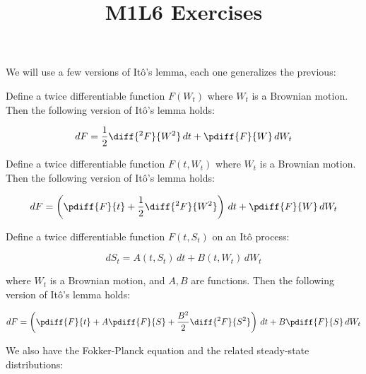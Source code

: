 \documentclass{article}
\begin{document}
	\title{M1L6 Exercises}
	\maketitle
	
	We will use a few versions of It\^o's lemma, each one generalizes the previous:
	
	\begin{lemma}\label{ito1}
		Define a twice differentiable function $F(W_t)$ where $W_t$ is a Brownian motion. Then the following version of It\^o's lemma holds:
		
		\begin{equation*}
			dF = \frac{1}{2} \diff{^2F}{W^2} \, dt + \pdiff{F}{W} \, dW_t
		\end{equation*}
	\end{lemma}
	
	\begin{lemma}\label{ito2}
		Define a twice differentiable function $F(t,W_t)$ where $W_t$ is a Brownian motion. Then the following version of It\^o's lemma holds:
		
		\begin{equation*}
			dF = \left(\pdiff{F}{t} + \frac{1}{2} \diff{^2F}{W^2}\right) \, dt + \pdiff{F}{W} \, dW_t
		\end{equation*}
	\end{lemma}
	
	\begin{lemma}\label{ito3}
		Define a twice differentiable function $F(t,S_t)$ on an It\^o process:
		
		\begin{equation*}
			dS_t = A(t,S_t) \, dt + B(t,W_t) \, dW_t
		\end{equation*}
		
		where $W_t$ is a Brownian motion, and $A,B$ are functions. Then the following version of It\^o's lemma holds:
		
		\begin{equation*}
			dF = \left(\pdiff{F}{t} + A\pdiff{F}{S} + \frac{B^2}{2} \diff{^2F}{S^2}\right) \, dt + B\pdiff{F}{S} \, dW_t
		\end{equation*}
	\end{lemma}
	
	We also have the Fokker-Planck equation and the related steady-state distributions:
	
\end{document}
